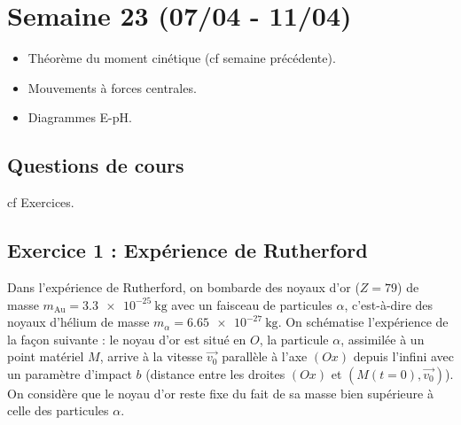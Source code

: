 \section{Semaine 23 (07/04 - 11/04) }


\begin{itemize}
	\item Théorème du moment cinétique (cf semaine précédente).
	\item Mouvements à forces centrales.
	\item Diagrammes E-pH.
\end{itemize}

\subsection{Questions de cours}

cf Exercices.

\subsection{Exercice 1 : Expérience de Rutherford}

Dans l'expérience de Rutherford, on bombarde des noyaux d'or ($Z = 79$) de masse $m_{\textrm{Au}} = \SI{3.3e-25}{\kilogram}$ avec un faisceau de particules $\alpha$, c'est-à-dire des noyaux d'hélium de masse $m_\alpha = \SI{6.65e-27}{\kilogram}$. On schématise l'expérience de la façon suivante : le noyau d'or est situé en $O$, la particule $\alpha$, assimilée à un point matériel $M$, arrive à la vitesse $\vec{v_0}$ parallèle à l'axe $(Ox)$ depuis l'infini avec un paramètre d'impact $b$ (distance entre les droites $(Ox)$ et $(M(t=0), \vec{v_0})$). On considère que le noyau d'or reste fixe du fait de sa masse bien supérieure à celle des particules $\alpha$.


